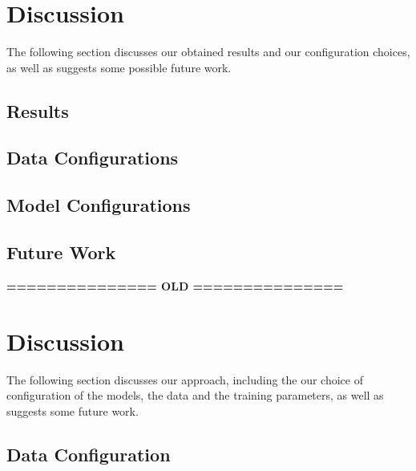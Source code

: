 \documentclass[./main.tex]{subfiles}
\begin{document}
\section{Discussion}
The following section discusses our obtained results and our configuration choices, as well as suggests some possible future work. 

\subsection{Results}


\subsection{Data Configurations}

\subsection{Model Configurations}

\subsection{Future Work}

\noindent \textbf{=============== OLD ===============}
\section{Discussion}
The following section discusses our approach, including the our choice of configuration of the models, the data and the training parameters, as well as suggests some future work.


\subsection{Data Configuration}
\end{document}
